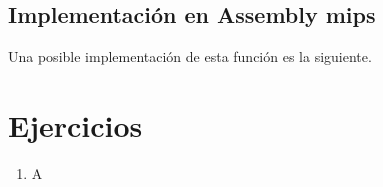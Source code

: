 \documentclass[a4paper,11pt]{article}
\begin{document}
\subsection{Implementación en Assembly mips}
Una posible implementación de esta función es la siguiente.



\section{Ejercicios}

\begin{enumerate}
\item A
\end{enumerate}
\end{document}

